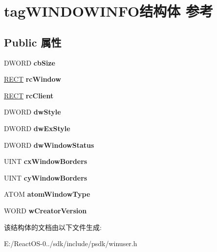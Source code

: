 \hypertarget{structtag_w_i_n_d_o_w_i_n_f_o}{}\section{tag\+W\+I\+N\+D\+O\+W\+I\+N\+F\+O结构体 参考}
\label{structtag_w_i_n_d_o_w_i_n_f_o}
\subsection*{Public 属性}
\begin{DoxyCompactItemize}
\item 
\mbox{\label{structtag_w_i_n_d_o_w_i_n_f_o_a50e37fa51a9fc5794cf32d24c329173e}} 
D\+W\+O\+RD {\bfseries cb\+Size}
\item 
\mbox{\label{structtag_w_i_n_d_o_w_i_n_f_o_af6ac7c771633244f7726a23a63063643}} 
\hyperlink{structtag_r_e_c_t}{R\+E\+CT} {\bfseries rc\+Window}
\item 
\mbox{\label{structtag_w_i_n_d_o_w_i_n_f_o_a1b48aef226eaffb4bf27da478b94e136}} 
\hyperlink{structtag_r_e_c_t}{R\+E\+CT} {\bfseries rc\+Client}
\item 
\mbox{\label{structtag_w_i_n_d_o_w_i_n_f_o_a80dde3534af47664b57f1c0d238f2a60}} 
D\+W\+O\+RD {\bfseries dw\+Style}
\item 
\mbox{\label{structtag_w_i_n_d_o_w_i_n_f_o_a62734458d78a5da033a129d66ec5df6b}} 
D\+W\+O\+RD {\bfseries dw\+Ex\+Style}
\item 
\mbox{\label{structtag_w_i_n_d_o_w_i_n_f_o_a27c4f63991e076893f029f9f4e2ba464}} 
D\+W\+O\+RD {\bfseries dw\+Window\+Status}
\item 
\mbox{\label{structtag_w_i_n_d_o_w_i_n_f_o_abe69584665a98d325a0a148d1588c406}} 
U\+I\+NT {\bfseries cx\+Window\+Borders}
\item 
\mbox{\label{structtag_w_i_n_d_o_w_i_n_f_o_ad75a0bb4cff93fe06556085ea0027ff5}} 
U\+I\+NT {\bfseries cy\+Window\+Borders}
\item 
\mbox{\label{structtag_w_i_n_d_o_w_i_n_f_o_a2fc8d399270388532ffc25dc4bce0378}} 
A\+T\+OM {\bfseries atom\+Window\+Type}
\item 
\mbox{\label{structtag_w_i_n_d_o_w_i_n_f_o_aac8ac42d5989368f90e3021485328ccf}} 
W\+O\+RD {\bfseries w\+Creator\+Version}
\end{DoxyCompactItemize}


该结构体的文档由以下文件生成\+:\begin{DoxyCompactItemize}
\item 
E\+:/\+React\+O\+S-\/0../sdk/include/psdk/winuser.\+h\end{DoxyCompactItemize}
